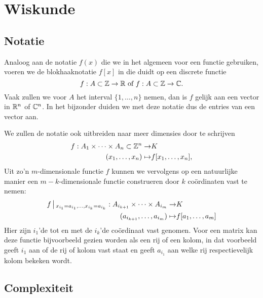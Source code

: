 \section{Wiskunde}

\subsection{Notatie}
Analoog aan de notatie $f(x)$ die we in het algemeen voor een functie gebruiken, voeren we de blokhaaknotatie $f[x]$ in die duidt op een discrete functie
\[
f:A\subset \mathbb{Z}\to \mathbb{R} \text{ of } f:A\subset \mathbb{Z}\to \mathbb{C}.  
\]
Vaak zullen we voor $A$ het interval $\{1,\ldots,n\}$ nemen, 
dan is $f$ gelijk aan een vector in $\mathbb{R}^n$ of $\mathbb{C}^n$.
In het bijzonder duiden we met deze notatie dus de entries van een vector aan.

We zullen de notatie ook uitbreiden naar meer dimensies door te schrijven
\begin{equation*}
\begin{split}
f: A_1\times \cdots \times A_n\subset \mathbb{Z}^n \to& K \\
       (x_1,\ldots,x_n) \mapsto& f[x_1,\ldots,x_n],
\end{split}
\end{equation*}
Uit zo'n $m$-dimensionale functie $f$ kunnen we vervolgens op een natuurlijke manier een $m-k$-dimensionale
functie construeren door $k$ co\"ordinaten vast te nemen:
\begin{equation*}
\begin{split}
f\,\big|\,_{x_{i_1}=a_{i_1},\ldots,x_{i_k}=a_{i_k}}: A_{i_{k+1}}\times\cdots\times A_{i_{m}} \to& K \\
(a_{i_{k+1}},\ldots,a_{i_{m}}) \mapsto& f[a_1,\ldots,a_m]
\end{split}
\end{equation*}
Hier zijn $i_1$'de tot en met de $i_k$'de co\"ordinaat vast genomen. Voor een matrix kan deze functie
bijvoorbeeld gezien worden als een rij of een kolom, in dat voorbeeld geeft $i_1$ aan of de rij of kolom
vast staat en geeft $a_{i_1}$ aan welke rij respectievelijk kolom bekeken wordt.

\subsection{Complexiteit}

